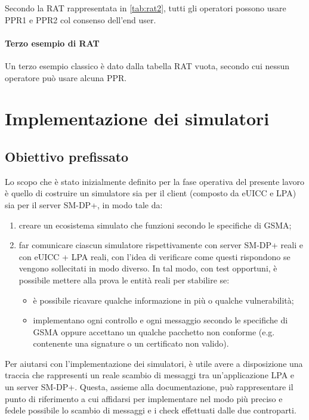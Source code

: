 \documentclass[10pt, oneside]{book}
\begin{document}
Secondo la RAT rappresentata in \ref{tab:rat2}, tutti gli operatori possono usare PPR1 e PPR2 col consenso dell'end user.

\subsubsection{Terzo esempio di RAT}
Un terzo esempio classico è dato dalla tabella RAT vuota, secondo cui nessun operatore può usare alcuna PPR.

\chapter{Implementazione dei simulatori}
\section{Obiettivo prefissato}
Lo scopo che è stato inizialmente definito per la fase operativa del presente lavoro è quello di costruire un simulatore sia per il client (composto da eUICC e LPA) sia per il server SM-DP+, in modo tale da:
\begin{enumerate}
\item creare un ecosistema simulato che funzioni secondo le specifiche di GSMA;
\item far comunicare ciascun simulatore rispettivamente con server SM-DP+ reali e con eUICC + LPA reali, con l'idea di verificare come questi rispondono se vengono sollecitati in modo diverso. In tal modo, con test opportuni, è possibile mettere alla prova le entità reali per stabilire se:
\begin{itemize}[itemsep=0pt]
\item è possibile ricavare qualche informazione in più o qualche vulnerabilità;
\item implementano ogni controllo e ogni messaggio secondo le specifiche di GSMA oppure accettano un qualche pacchetto non conforme (e.g. contenente una signature o un certificato non valido).
\end{itemize}
\end{enumerate}
Per aiutarsi con l'implementazione dei simulatori, è utile avere a disposizione una traccia che rappresenti un reale scambio di messaggi tra un'applicazione LPA e un server SM-DP+. Questa, assieme alla documentazione, può rappresentare il punto di riferimento a cui affidarsi per implementare nel modo più preciso e fedele possibile lo scambio di messaggi e i check effettuati dalle due controparti.
\end{document}
